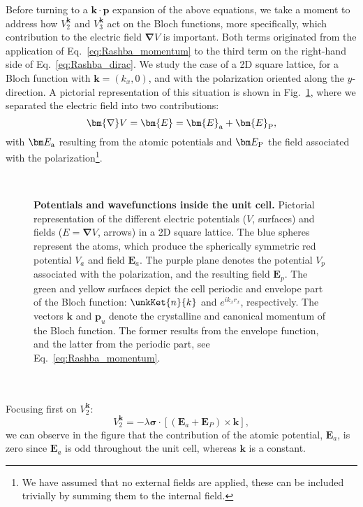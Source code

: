 Before turning to a $\bm{k} \cdot \bm{p}$ expansion of the above equations, we take a moment to address how $V^{\bm k}_2$ and $V^{\bm k}_3$ act on the Bloch functions, more specifically, which contribution to the electric field $\bm{\nabla}V$ is important.
Both terms originated from the application of Eq.~\eqref{eq:Rashba_momentum} to the third term on the right-hand side of Eq.~\eqref{eq:Rashba_dirac}.
We study the case of a 2D square lattice, for a Bloch function with $\bm k = (k_x, 0)$, and with the polarization oriented along the $y$-direction.
A pictorial representation of this situation is shown in Fig.~\ref{fig:Efield_cell_drawing}, where we separated the electric field into two contributions:
\begin{equation}
	\bm{\nabla} V = \bm{E} = \bm{E}_{\rm a} + \bm{E}_{\rm P},
\end{equation}
with $\bm E_{\rm a}$ resulting from the atomic potentials and $\bm E_{\rm P}$ the field associated with the polarization\footnote{We have assumed that no external fields are applied, these can be included trivially by summing them to the internal field.}.
\begin{figure}[h]
~\centering
{}\caption{\label{fig:Efield_cell_drawing}{\bf Potentials and wavefunctions inside the unit cell.} Pictorial representation of the different electric potentials ($V$, surfaces) and fields ($E=\bm \nabla V$, arrows) in a 2D square lattice. The blue spheres represent the atoms, which produce the spherically symmetric red potential $V_a$ and field $\bm E_a$. The purple plane denotes the potential $V_p$ associated with the polarization, and the resulting field $\bm E_p$. The green and yellow surfaces depict the cell periodic and envelope part of the Bloch function: $\unkKet{n}{k}$ and $e^{ik_x r_x}$, respectively. The vectors $\bm k$ and $\bm p_u$ denote the crystalline and canonical momentum of the Bloch function.
The former results from the envelope function, and the latter from the periodic part, see Eq.~\eqref{eq:Rashba_momentum}.}
\end{figure}
\\\\
Focusing first on $V^{\bm k}_2$:
\begin{equation}
	\label{eq:Rashba_purerel}
	V^{\bm k}_2 = -\lambda \bm{\sigma} \cdot \left[ (\bm E_a + \bm E_P) \times \bm{k}\right],
\end{equation}
we can observe in the figure that the contribution of the atomic potential, $\bm E_a$, is zero since $\bm E_a$ is odd throughout the unit cell, whereas $\bm k$ is a constant.
